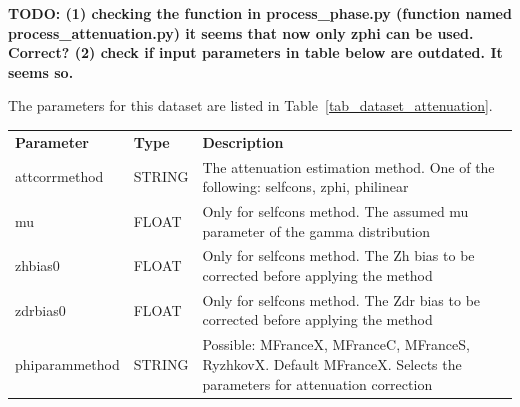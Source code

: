 \documentclass[a4paper,11pt,pdftex,twoside]{scrartcl}
\renewcommand{\bf}{\normalfont \bfseries}
\begin{document}
{{{{\bf TODO: (1) checking the function in process\_phase.py (function named process\_attenuation.py) it seems that now only zphi can be used. Correct? (2) check if input parameters in table below are outdated. It seems so. }

The parameters for this dataset are listed in Table~\ref{tab_dataset_attenuation}.

\begin{table}[H]
\begin{tabularx}{\textwidth}{llX}
\bf{Parameter}  & \bf{Type}  & \bf{Description}\\
attcorrmethod & STRING & The attenuation estimation method. One of the following: selfcons, zphi, philinear\\
mu & FLOAT & Only for selfcons method. The assumed mu parameter of the gamma distribution\\
zhbias0 & FLOAT & Only for selfcons method. The Zh bias to be corrected before applying the method\\
zdrbias0 & FLOAT & Only for selfcons method. The Zdr bias to be corrected before applying the method\\
phiparammethod & STRING & Possible: MFranceX, MFranceC, MFranceS, RyzhkovX. Default MFranceX. Selects the parameters for attenuation correction\\


\end{tabularx}
\end{table}}}}
\end{document}
